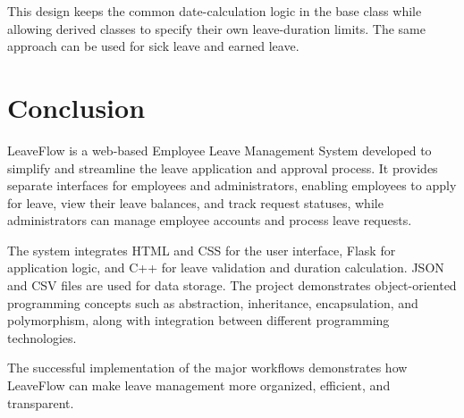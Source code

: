 \documentclass[12pt,a4paper,oneside]{book}
\begin{document}
This design keeps the common date-calculation logic in the base class while allowing derived classes to specify their own leave-duration limits. The same approach can be used for sick leave and earned leave.



\FloatBarrier

\section{Conclusion}



LeaveFlow is a web-based Employee Leave Management System developed to simplify and streamline the leave application and approval process. It provides separate interfaces for employees and administrators, enabling employees to apply for leave, view their leave balances, and track request statuses, while administrators can manage employee accounts and process leave requests.



The system integrates HTML and CSS for the user interface, Flask for application logic, and C++ for leave validation and duration calculation. JSON and CSV files are used for data storage. The project demonstrates object-oriented programming concepts such as abstraction, inheritance, encapsulation, and polymorphism, along with integration between different programming technologies.



The successful implementation of the major workflows demonstrates how LeaveFlow can make leave management more organized, efficient, and transparent.
\end{document}
